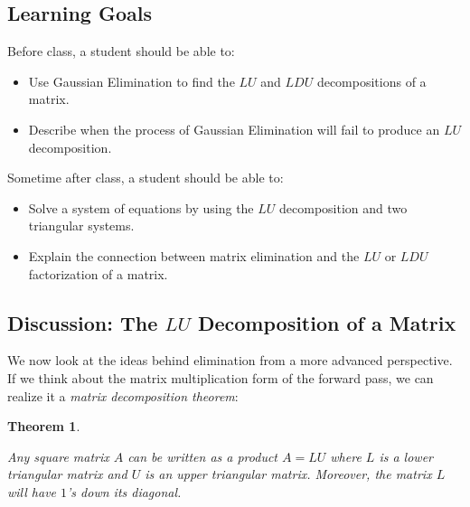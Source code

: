 \documentclass[10pt,]{book}
\theoremstyle{plain}
\newtheorem{theorem}{Theorem}[chapter]
\theoremstyle{definition}
\numberwithin{equation}{section}
\begin{document}
\subsection[Learning Goals]{Learning Goals}\label{subsection-47}

      Before class, a student should be able to:
\begin{itemize}
\item{}
        Use Gaussian Elimination to find the \(LU\) and \(LDU\)
        decompositions of a matrix.
      \item{}
        Describe when the process of Gaussian Elimination will fail to
        produce an \(LU\) decomposition.
      \end{itemize}
\par

      Sometime after class, a student should be able to:
\begin{itemize}
\item{}
        Solve a system of equations by using the \(LU\) decomposition and
        two triangular systems.
      \item{}
        Explain the connection between matrix elimination and the \(LU\)
        or \(LDU\) factorization of a matrix.
      \end{itemize}
\typeout{************************************************}
\typeout{************************************************}
\subsection[Discussion: The \(LU\) Decomposition of a Matrix]{Discussion: The \(LU\) Decomposition of a Matrix}\label{subsection-48}

      We now look at the ideas behind elimination from a more advanced
      perspective. If we think about the matrix multiplication form of the
      forward pass, we can realize it a \emph{matrix decomposition theorem}:
\begin{theorem}\label{theorem-2}

        Any square matrix \(A\) can be written as a product \(A = LU\)
        where \(L\)
        is a lower triangular matrix and \(U\) is an upper triangular matrix.
        Moreover, the matrix \(L\) will have \(1\)'s down its diagonal.
      \end{theorem}
\par
\end{document}
